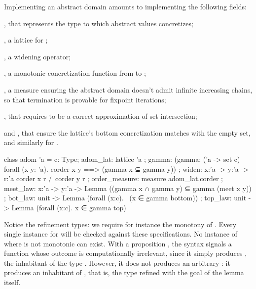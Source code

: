 \documentclass{llncs}
\begin{document}
%
Implementing an abstract domain amounts to implementing the
following fields: \begin{enumi}
%
\item {}, that represents the type to which abstract values
 concretizes;
%
\item {}, a lattice for ;
%
\item {}, a widening operator;
%
\item {}, a monotonic concretization function from 
to ;
%
\item {}, a measure ensuring the abstract
domain doesn't admit infinite increasing chains, so that
termination is provable for fixpoint iterations;
%
\item {}, that requires  to be a correct
approximation of set intersection;
%
\item {} and , that ensure the lattice's
bottom concretization matches with the empty set, and similarly
for .
\end{enumi}
%
\begin{fstarcode}
class adom 'a = { c: Type; adom_lat: lattice 'a
  ; gamma: (gamma: ('a -> set c) {forall (x y: 'a). corder x y ==> (gamma x ⊆ gamma y)})
  ; widen: x:'a -> y:'a -> r:'a {corder x r /\ corder y r}
  ; order_measure: measure adom_lat.corder
  ; meet_law: x:'a -> y:'a -> Lemma ((gamma x ∩ gamma y) ⊆ gamma (meet x y))
  ; bot_law: unit -> Lemma (forall (x:c). ~(x ∈ gamma bottom))
  ; top_law: unit -> Lemma (forall (x:c). x ∈ gamma top)}
\end{fstarcode}
%
Notice the refinement types: we require for instance the monotony
of .
%
Every single instance for  will be checked against
these specifications. No instance of  where
 is not monotonic can exist.
%
With a proposition , the  syntax signals a
function whose outcome is computationally irrelevant, since it
simply produces \fcode{()}, the inhabitant of the type
.
%
However, it does not produces an arbitrary : it
produces an inhabitant of , that is, the type
 refined with the goal  of the lemma itself.
%
\end{document}
